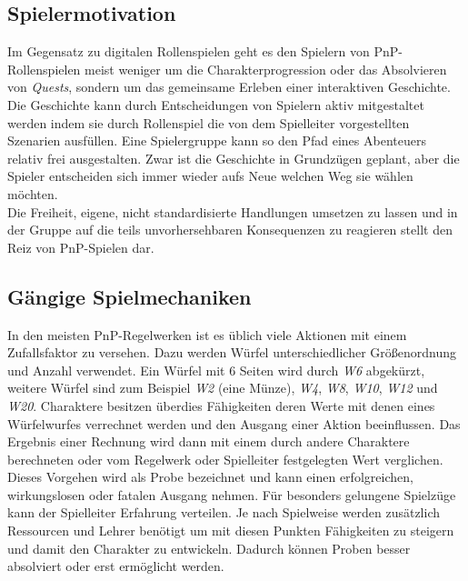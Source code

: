 \subsection{Spielermotivation}
\label{sec:Spielermotivation}

Im Gegensatz zu digitalen Rollenspielen geht es den Spielern von PnP-Rollenspielen meist weniger um die Charakterprogression oder das Absolvieren von \emph{Quests}, sondern um das gemeinsame Erleben einer interaktiven Geschichte. Die Geschichte kann durch Entscheidungen von Spielern aktiv mitgestaltet werden indem sie durch Rollenspiel die von dem Spielleiter vorgestellten Szenarien ausfüllen. Eine Spielergruppe kann so den Pfad eines Abenteuers relativ frei ausgestalten. Zwar ist die Geschichte in Grundzügen geplant, aber die Spieler entscheiden sich immer wieder aufs Neue welchen Weg sie wählen möchten. \cite{Arinbjarnar}\\
Die Freiheit, eigene, nicht standardisierte Handlungen umsetzen zu lassen und in der Gruppe auf die teils unvorhersehbaren Konsequenzen zu reagieren stellt den Reiz von PnP-Spielen dar. 


\subsection{Gängige Spielmechaniken}
\label{sec:Spielmechaniken}

In den meisten PnP-Regelwerken ist es üblich viele Aktionen mit einem Zufallsfaktor zu versehen. Dazu werden Würfel unterschiedlicher Größenordnung und Anzahl verwendet. Ein Würfel mit 6 Seiten wird durch \textit{W6} abgekürzt, weitere Würfel sind zum Beispiel \textit{W2} (eine Münze), \textit{W4}, \textit{W8}, \textit{W10}, \textit{W12} und \textit{W20}.\newline
Charaktere besitzen überdies Fähigkeiten deren Werte mit denen eines Würfelwurfes verrechnet werden und den Ausgang einer Aktion beeinflussen. Das Ergebnis einer Rechnung wird dann mit einem durch andere Charaktere berechneten oder vom Regelwerk oder Spielleiter festgelegten Wert verglichen. Dieses Vorgehen wird als Probe bezeichnet und kann einen erfolgreichen, wirkungslosen oder fatalen Ausgang nehmen.\newline
Für besonders gelungene Spielzüge kann der Spielleiter Erfahrung verteilen. Je nach Spielweise werden zusätzlich Ressourcen und Lehrer benötigt um mit diesen Punkten Fähigkeiten zu steigern und damit den Charakter zu entwickeln. Dadurch können Proben besser absolviert oder erst ermöglicht werden.



